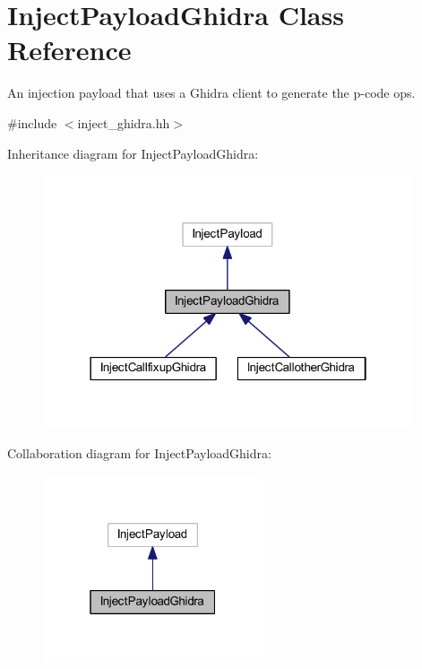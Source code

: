 \hypertarget{class_inject_payload_ghidra}{}\section{Inject\+Payload\+Ghidra Class Reference}
\label{class_inject_payload_ghidra}


An injection payload that uses a Ghidra client to generate the p-\/code ops.  




{\ttfamily \#include $<$inject\+\_\+ghidra.\+hh$>$}



Inheritance diagram for Inject\+Payload\+Ghidra\+:
\nopagebreak
\begin{figure}[H]
\begin{center}
\leavevmode
\includegraphics[width=310pt]{class_inject_payload_ghidra__inherit__graph}
\end{center}
\end{figure}


Collaboration diagram for Inject\+Payload\+Ghidra\+:
\nopagebreak
\begin{figure}[H]
\begin{center}
\leavevmode
\includegraphics[width=184pt]{class_inject_payload_ghidra__coll__graph}
\end{center}
\end{figure}

